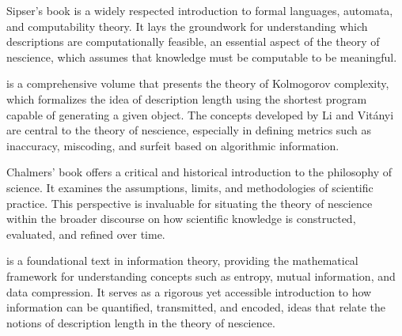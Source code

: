 Sipser's book \cite{sipser2012introduction} is a widely respected introduction to formal languages, automata, and computability theory. It lays the groundwork for understanding which descriptions are computationally feasible, an essential aspect of the theory of nescience, which assumes that knowledge must be computable to be meaningful.

\cite{li2013introduction} is a comprehensive volume that presents the theory of Kolmogorov complexity, which formalizes the idea of description length using the shortest program capable of generating a given object. The concepts developed by Li and Vitányi are central to the theory of nescience, especially in defining metrics such as inaccuracy, miscoding, and surfeit based on algorithmic information.

Chalmers' book \cite{chalmers2013thing} offers a critical and historical introduction to the philosophy of science. It examines the assumptions, limits, and methodologies of scientific practice. This perspective is invaluable for situating the theory of nescience within the broader discourse on how scientific knowledge is constructed, evaluated, and refined over time.

\cite{cover2012elements} is a foundational text in information theory, providing the mathematical framework for understanding concepts such as entropy, mutual information, and data compression. It serves as a rigorous yet accessible introduction to how information can be quantified, transmitted, and encoded, ideas that relate the notions of description length in the theory of nescience.
